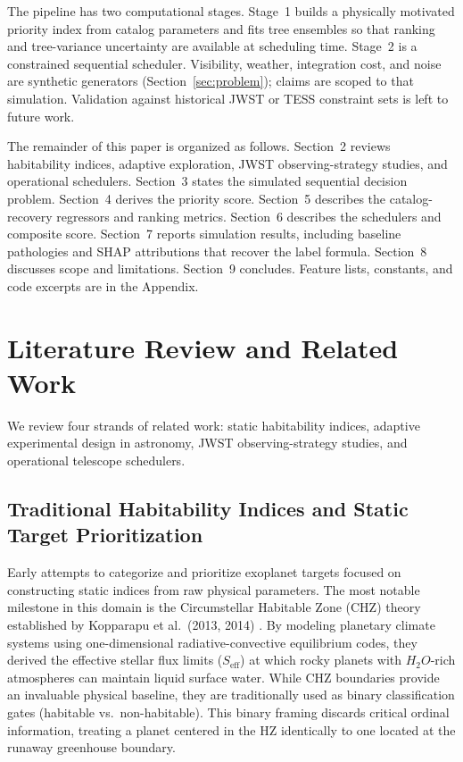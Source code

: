 \documentclass[11pt,a4paper]{article}
\begin{document}
The pipeline has two computational stages. Stage~1 builds a physically motivated priority index from catalog parameters and fits tree ensembles so that ranking and tree-variance uncertainty are available at scheduling time. Stage~2 is a constrained sequential scheduler. Visibility, weather, integration cost, and noise are synthetic generators (Section~\ref{sec:problem}); claims are scoped to that simulation. Validation against historical JWST or TESS constraint sets is left to future work.

The remainder of this paper is organized as follows. Section~2 reviews habitability indices, adaptive exploration, JWST observing-strategy studies, and operational schedulers. Section~3 states the simulated sequential decision problem. Section~4 derives the priority score. Section~5 describes the catalog-recovery regressors and ranking metrics. Section~6 describes the schedulers and composite score. Section~7 reports simulation results, including baseline pathologies and SHAP attributions that recover the label formula. Section~8 discusses scope and limitations. Section~9 concludes. Feature lists, constants, and code excerpts are in the Appendix.

\section{Literature Review and Related Work}
\label{sec:litreview}

We review four strands of related work: static habitability indices, adaptive experimental design in astronomy, JWST observing-strategy studies, and operational telescope schedulers.

\subsection{Traditional Habitability Indices and Static Target Prioritization}

Early attempts to categorize and prioritize exoplanet targets focused on constructing static indices from raw physical parameters. The most notable milestone in this domain is the Circumstellar Habitable Zone (CHZ) theory established by Kopparapu et al.\ (2013, 2014) \cite{kopparapu2013, kopparapu2014}. By modeling planetary climate systems using one-dimensional radiative-convective equilibrium codes, they derived the effective stellar flux limits ($S_{\text{eff}}$) at which rocky planets with $H_2O$-rich atmospheres can maintain liquid surface water. While CHZ boundaries provide an invaluable physical baseline, they are traditionally used as binary classification gates (habitable vs.\ non-habitable). This binary framing discards critical ordinal information, treating a planet centered in the HZ identically to one located at the runaway greenhouse boundary.
\end{document}
